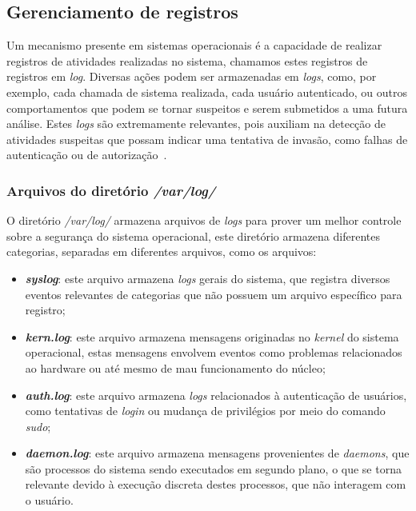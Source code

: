 \documentclass[
  12pt,				%
  oneside,   	        %
  a4paper,			%
  english,			%
  french,				%
  spanish,			%
  brazil,				%
  ]{pacotes/abntex2}
\begin{document}
\subsection{Gerenciamento de registros}
Um mecanismo presente em sistemas operacionais é a capacidade de realizar registros de atividades realizadas no sistema, chamamos estes registros de registros em \textit{log}. Diversas ações podem ser armazenadas em \textit{logs}, como, por exemplo, cada chamada de sistema realizada, cada usuário autenticado, ou outros comportamentos que podem se tornar suspeitos e serem submetidos a uma futura análise. Estes \textit{logs} são extremamente relevantes, pois auxiliam na detecção de atividades suspeitas que possam indicar uma tentativa de invasão, como falhas de autenticação ou de autorização~\cite{silberschatz2015}.

\subsubsection{Arquivos do diretório \textit{/var/log/}}
O diretório \textit{/var/log/} armazena arquivos de \textit{logs} para prover um melhor controle sobre a segurança do sistema operacional, este diretório armazena diferentes categorias, separadas em diferentes arquivos, como os arquivos:

\begin{itemize}
    \item \textbf{\textit{syslog}}: este arquivo armazena \textit{logs} gerais do sistema, que registra diversos eventos relevantes de categorias que não possuem um arquivo específico para registro;
    \item \textbf{\textit{kern.log}}: este arquivo armazena mensagens originadas no \textit{kernel} do sistema operacional, estas mensagens envolvem eventos como problemas relacionados ao hardware ou até mesmo de mau funcionamento do núcleo;
    \item \textbf{\textit{auth.log}}: este arquivo armazena \textit{logs} relacionados à autenticação de usuários, como tentativas de \textit{login} ou mudança de privilégios por meio do comando \textit{sudo};
    \item \textbf{\textit{daemon.log}}: este arquivo armazena mensagens provenientes de \textit{daemons}, que são processos do sistema sendo executados em segundo plano, o que se torna relevante devido à execução discreta destes processos, que não interagem com o usuário.
\end{itemize}
\end{document}
